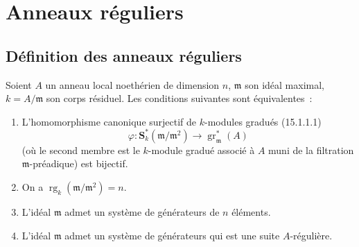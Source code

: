 \section{Anneaux réguliers}
\label{section:0.17-fr}

\subsection{Définition des anneaux réguliers}
\label{subsection:0.17.1-fr}

\begin{proposition}[17.1.1]
\label{0.17.1.1-fr}
Soient $A$ un anneau local noethérien de dimension $n$, $\mathfrak{m}$ son
idéal maximal, $k=A/\mathfrak{m}$ son corps résiduel. Les conditions suivantes
sont équivalentes~:
\begin{enumerate}
  \item[\rm a)] L'homomorphisme canonique surjectif de $k$-modules gradués
  (15.1.1.1)
  \[
    \varphi:\mathbf{S}^*_k(\mathfrak{m}/\mathfrak{m}^2)
    \longrightarrow\operatorname{gr}^*_{\mathfrak{m}}(A)
  \]
  (où le second membre est le $k$-module gradué associé à $A$ muni de la
  filtration $\mathfrak{m}$-préadique) est bijectif.
  \item[\rm b)] On a
  $\operatorname{rg}_k(\mathfrak{m}/\mathfrak{m}^2)=n$.
  \item[\rm c)] L'idéal $\mathfrak{m}$ admet un système de générateurs de $n$
  éléments.
  \item[\rm d)] L'idéal $\mathfrak{m}$ admet un système de générateurs qui est
  une suite $A$-régulière.
\end{enumerate}
\end{proposition}


